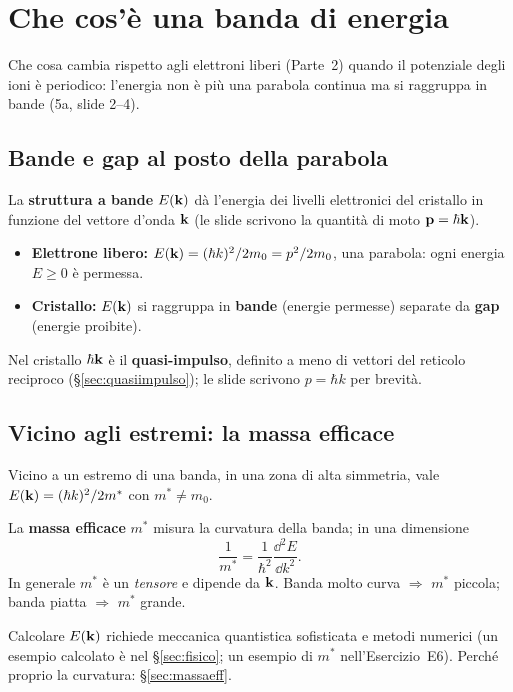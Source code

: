 \documentclass[11pt,a4paper]{article}
\begin{document}
\section{Che cos'è una banda di energia}\label{sec:panoramica}
Che cosa cambia rispetto agli elettroni liberi (Parte~2) quando il potenziale degli ioni è periodico: l'energia non è più una parabola continua ma
si raggruppa in bande (5a, slide 2--4).

\subsection{Bande e gap al posto della parabola}
\begin{definizione}
La \textbf{struttura a bande}  $E(\mathbf k)$ dà l'energia dei livelli elettronici del cristallo in funzione del vettore
d'onda $\mathbf k$ (le slide scrivono la quantità di moto $\mathbf p=\hbar\mathbf k$).
\end{definizione}
\begin{itemize}[leftmargin=*]
\item \textbf{Elettrone libero:} $E(\mathbf k)=(\hbar k)^2/2m_0=p^2/2m_0$, una parabola: ogni energia $E\ge0$ è permessa.
\item \textbf{Cristallo:} $E(\mathbf k)$ si raggruppa in \textbf{bande} (energie permesse) separate da \textbf{gap} (energie proibite).
\end{itemize}

\begin{osservazione}
Nel cristallo $\hbar\mathbf k$ è il \textbf{quasi-impulso}, definito a meno di vettori del reticolo reciproco (§\ref{sec:quasiimpulso}); le slide
scrivono $p=\hbar k$ per brevità.
\end{osservazione}

\subsection{Vicino agli estremi: la massa efficace}
Vicino a un estremo di una banda, in una zona di alta simmetria, vale $E(\mathbf k)=(\hbar k)^2/2m^*$ con $m^*\ne m_0$.
\begin{definizione}
La \textbf{massa efficace} $m^*$  misura la curvatura della banda; in una dimensione
\[
\frac1{m^*}=\frac1{\hbar^2}\frac{\dd^2E}{\dd k^2}.
\]
In generale $m^*$ è un \emph{tensore} e dipende da $\mathbf k$. Banda molto curva $\Rightarrow$ $m^*$ piccola; banda piatta $\Rightarrow$ $m^*$ grande.
\end{definizione}
Calcolare $E(\mathbf k)$ richiede meccanica quantistica sofisticata e metodi numerici (un esempio calcolato è nel §\ref{sec:fisico}; un esempio di $m^*$ nell'Esercizio~E6).
Perché proprio la curvatura: §\ref{sec:massaeff}.
\end{document}
